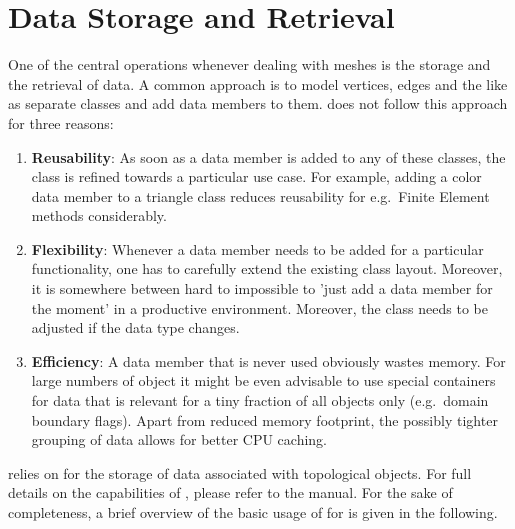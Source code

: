 \chapter{Data Storage and Retrieval} \label{chap:data}
One of the central operations whenever dealing with meshes is the storage and the retrieval of data.
A common approach is to model vertices, edges and the like as separate classes and add data members to them.
{\ViennaGrid} does not follow this approach for three reasons:
\begin{enumerate}
 \item \textbf{Reusability}: As soon as a data member is added to any of these classes, the class is refined towards a particular use case. For example, adding a color data member to a triangle class reduces reusability for e.g.~Finite Element methods considerably.
 \item \textbf{Flexibility}: Whenever a data member needs to be added for a particular functionality, one has to carefully extend the existing class layout. Moreover, it is somewhere between hard to impossible to 'just add a data member for the moment' in a productive environment. Moreover, the class needs to be adjusted if the data type changes.
 \item \textbf{Efficiency}: A data member that is never used obviously wastes memory. For large numbers of object it might be even advisable to use special containers for data that is relevant for a tiny fraction of all objects only (e.g.~domain boundary flags). Apart from reduced memory footprint, the possibly tighter grouping of data allows for better CPU caching. 
\end{enumerate}
{\ViennaGrid} relies on {\ViennaData} \cite{ViennaData} for the storage of data associated with topological objects.
For full details on the capabilities of {\ViennaData}, please refer to the {\ViennaData} manual.
For the sake of completeness, a brief overview of the basic usage of {\ViennaData} for {\ViennaGrid} is given in the following.


